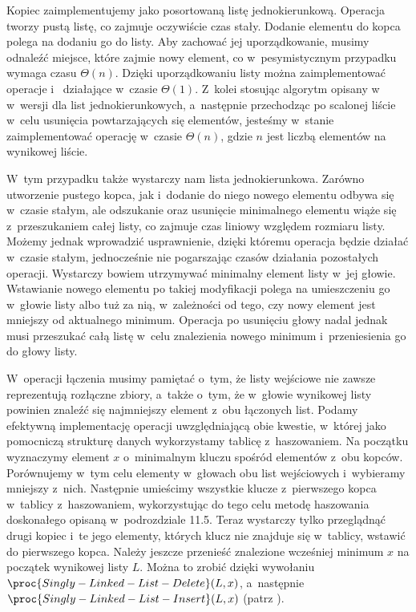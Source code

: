 
\subproblem %
Kopiec zaimplementujemy jako posortowaną listę jednokierunkową.
Operacja  tworzy pustą listę, co zajmuje oczywiście czas stały.
Dodanie elementu do kopca polega na dodaniu go do listy.
Aby zachować jej uporządkowanie, musimy odnaleźć miejsce, które zajmie nowy element, co w~pesymistycznym przypadku wymaga czasu $\Theta(n)$.
Dzięki uporządkowaniu listy można zaimplementować operacje  i~ działające w~czasie $\Theta(1)$.
Z~kolei stosując algorytm opisany w~ w~wersji dla list jednokierunkowych, a~następnie przechodząc po scalonej liście w~celu usunięcia powtarzających się elementów, jesteśmy w~stanie zaimplementować operację  w~czasie $\Theta(n)$, gdzie $n$ jest liczbą elementów na wynikowej liście.

\subproblem %
W~tym przypadku także wystarczy nam lista jednokierunkowa.
Zarówno utworzenie pustego kopca, jak i~dodanie do niego nowego elementu odbywa się w~czasie stałym, ale odszukanie oraz usunięcie minimalnego elementu wiąże się z~przeszukaniem całej listy, co zajmuje czas liniowy względem rozmiaru listy.
Możemy jednak wprowadzić usprawnienie, dzięki któremu operacja  będzie działać w~czasie stałym, jednocześnie nie pogarszając czasów działania pozostałych operacji.
Wystarczy bowiem utrzymywać minimalny element listy w~jej głowie.
Wstawianie nowego elementu po takiej modyfikacji polega na umieszczeniu go w~głowie listy albo tuż za nią, w~zależności od tego, czy nowy element jest mniejszy od aktualnego minimum.
Operacja  po usunięciu głowy nadal jednak musi przeszukać całą listę w~celu znalezienia nowego minimum i~przeniesienia go do głowy listy.

W~operacji łączenia musimy pamiętać o~tym, że listy wejściowe nie zawsze reprezentują rozłączne zbiory, a~także o~tym, że w~głowie wynikowej listy powinien znaleźć się najmniejszy element z~obu łączonych list.
Podamy efektywną implementację operacji  uwzględniającą obie kwestie, w~której jako pomocniczą strukturę danych wykorzystamy tablicę z~haszowaniem.
Na początku wyznaczymy element $x$ o~minimalnym kluczu spośród elementów z~obu kopców.
Porównujemy w~tym celu elementy w~głowach obu list wejściowych i~wybieramy mniejszy z~nich.
Następnie umieścimy wszystkie klucze z~pierwszego kopca w~tablicy z~haszowaniem, wykorzystując do tego celu metodę haszowania doskonałego opisaną w~podrozdziale 11.5.
Teraz wystarczy tylko przeglądnąć drugi kopiec i~te jego elementy, których klucz nie znajduje się w~tablicy, wstawić do pierwszego kopca.
Należy jeszcze przenieść znalezione wcześniej minimum $x$ na początek wynikowej listy $L$.
Można to zrobić dzięki wywołaniu $\proc{Singly-Linked-List-Delete}(L,x)$, a~następnie $\proc{Singly-Linked-List-Insert}(L,x)$ (patrz ).

